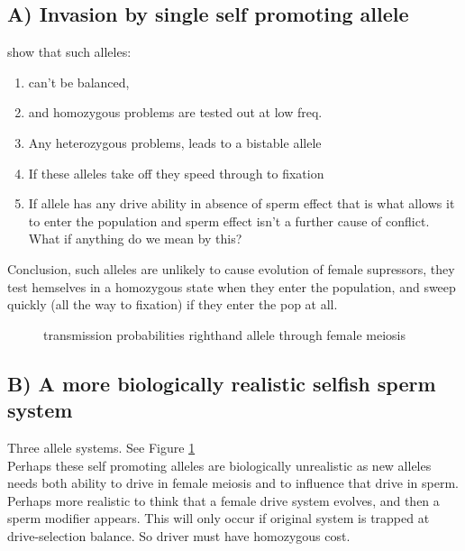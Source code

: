 \documentclass[12pt,letterpaper]{article}
\begin{document}
\subsection*{ A) Invasion by single self promoting allele}
show that such alleles:
\begin{enumerate}
\item can't be balanced, \\
\item and homozygous problems are tested out at low freq.  \\
\item Any heterozygous problems, leads to a bistable allele\\
\item If these alleles take off they speed through to fixation\\
\item If allele has any drive ability in absence of sperm effect that is what allows it to enter the population
and sperm effect isn't a further cause of conflict. What if anything do we mean by this?\\
\end{enumerate}

Conclusion, such alleles are unlikely to cause evolution of female supressors, they test hemselves in a homozygous
state when they enter the population, and sweep quickly (all the way to fixation) if they enter the pop at all.\\

\begin{figure}
\caption{transmission probabilities righthand allele through female
  meiosis}  \label{Eggsperm_3_allele_cartoon}
\end{figure}


\subsection*{B) A more biologically realistic selfish sperm system}
Three allele systems. See Figure \ref{Eggsperm_3_allele_cartoon} \\ 
Perhaps these self promoting alleles are biologically unrealistic as new alleles needs 
both ability to drive in female meiosis and to influence that drive in sperm.
Perhaps more realistic to think that a female drive system evolves, 
and then a sperm modifier appears. This will only occur if original system is trapped 
at drive-selection balance. So driver must have homozygous cost.
\end{document}

